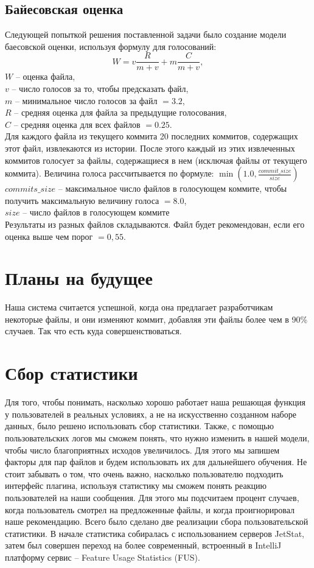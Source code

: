 \documentclass[times]{itmo-student-thesis}
\begin{document}
\subsection{Байесовская оценка}
Следующей попыткой решения поставленной задачи было создание модели баесовской оценки, используя формулу для голосований:
    $$W = v\frac{R}{m + v} + m\frac{C}{m + v},$$
$W$ -- оценка файла, \\
$v$ -- число голосов за то, чтобы предсказать файл, \\
$m$ -- минимальное число голосов за файл $= 3.2$, \\
$R$ -- средняя оценка для файла за предыдущие голосования, \\
${C}$ -- средняя оценка для всех файлов $= 0.25$. \\
Для каждого файла из текущего коммита 20 последних коммитов, содержащих этот файл, извлекаются из истории. После этого каждый из этих извлеченных коммитов голосует за файлы, содержащиеся в нем (исключая файлы от текущего коммита). Величина голоса рассчитывается по формуле: $\min(1.0, \frac{{commit\_size}}{{size}})$\\
$commits\_size$ --  максимальное число файлов в голосующем коммите, чтобы получить максимальную величину голоса $= 8.0$,\\
$size$ -- число файлов в голосующем коммите\\
Результаты из разных файлов складываются. Файл будет рекомендован, если его оценка выше чем порог $= 0,55$.
\section{Планы на будущее}
Наша система считается успешной, когда она предлагает разработчикам некоторые файлы, и они изменяют коммит, добавляя эти файлы более чем в 90\% случаев. Так что есть куда совершенствоваться.

\section{Сбор статистики}
Для того, чтобы понимать, насколько хорошо работает наша решающая функция у пользователей в реальных условиях, а не на искусственно созданном наборе данных, было решено использовать сбор статистики. Также, с помощью пользовательских логов мы сможем понять, что нужно изменить в нашей модели, чтобы число благоприятных исходов увеличилось. Для этого мы запишем факторы для пар файлов и будем использовать их для дальнейшего обучения. Не стоит забывать о том, что очень важно, насколько пользователю подходить интерфейс плагина, используя статистику мы сможем понять реакцию пользователей на наши сообщения. Для этого мы подсчитаем процент случаев, когда пользователь смотрел на предложенные файлы, и когда проигнорировал наше рекомендацию. Всего было сделано две реализации сбора пользовательской статистики. В начале статистика собиралась с использованием серверов JetStat, затем был совершен переход на более современный, встроенный в IntelliJ платформу сервис -- Feature Usage Statistics (FUS).
\end{document}
